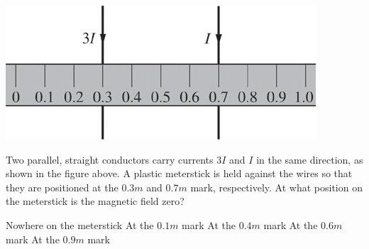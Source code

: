 \begin{center}
\includegraphics[scale=0.5]{images/img-002-003.png}
\end{center}

\begin{questions}\setcounter{question}{3}\question
Two parallel, straight conductors carry currents $3 I$ and $I$ in the same direction, as shown in the figure above. A plastic meterstick is held against the wires so that they are positioned at the $0.3 \unit{m}$ and $0.7 \unit{m}$ mark, respectively. At what position on the meterstick is the magnetic field zero?

\begin{choices}
\choice Nowhere on the meterstick
\choice At the $0.1 \unit{m}$ mark
\choice At the $0.4 \unit{m}$ mark
\choice At the $0.6 \unit{m}$ mark
\choice At the $0.9 \unit{m}$ mark
\end{choices}\end{questions}

